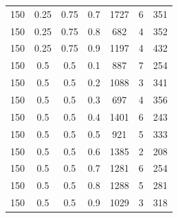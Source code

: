 \documentclass[a4paper,oneside,14pt]{extreport}
\begin{document}
\begin{table}[h]
\begin{center}
\begin{tabular}{|c|c|c|c|c|c|c|}
		150 & 0.25 & 0.75 & 0.7 & 1727 & 6 & 351 \\
		150 & 0.25 & 0.75 & 0.8 & 682 & 4 & 352 \\
		150 & 0.25 & 0.75 & 0.9 & 1197 & 4 & 432 \\
		150 & 0.5 & 0.5 & 0.1 & 887 & 7 & 254 \\
		150 & 0.5 & 0.5 & 0.2 & 1088 & 3 & 341 \\
		150 & 0.5 & 0.5 & 0.3 & 697 & 4 & 356 \\
		150 & 0.5 & 0.5 & 0.4 & 1401 & 6 & 243 \\
		150 & 0.5 & 0.5 & 0.5 & 921 & 5 & 333 \\
		150 & 0.5 & 0.5 & 0.6 & 1385 & 2 & 208 \\
		150 & 0.5 & 0.5 & 0.7 & 1281 & 6 & 254 \\
		150 & 0.5 & 0.5 & 0.8 & 1288 & 5 & 281 \\
		150 & 0.5 & 0.5 & 0.9 & 1029 & 3 & 318 \\
		\hline
		
	\end{tabular}
\end{center}
\end{table}
\end{document}
